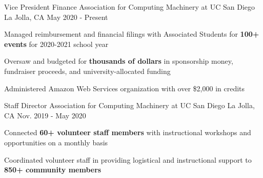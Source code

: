 
\begin{cventries}

  \cventry
    {Vice President Finance} %
    {Association for Computing Machinery at UC San Diego} %
    {La Jolla, CA} %
    {May 2020 - Present} %
    {
      \begin{cvitems} %
        \item {Managed reimbursement and financial filings with Associated Students for \textbf{100+ events} for 2020-2021 school year}
        \item {Oversaw and budgeted for \textbf{thousands of dollars} in sponsorship money, fundraiser proceeds, and university-allocated funding}
        \item {Administered Amazon Web Services organization with over \$2,000 in credits}
      \end{cvitems}
    }

  \cventry
    {Staff Director} %
    {Association for Computing Machinery at UC San Diego} %
    {La Jolla, CA} %
    {Nov. 2019 - May 2020} %
    {
      \begin{cvitems} %
        \item {Connected \textbf{60+ volunteer staff members} with instructional workshops and opportunities on a monthly basis}
        \item {Coordinated volunteer staff in providing logistical and instructional support to \textbf{850+ community members}}
      \end{cvitems}
    }


\end{cventries}
